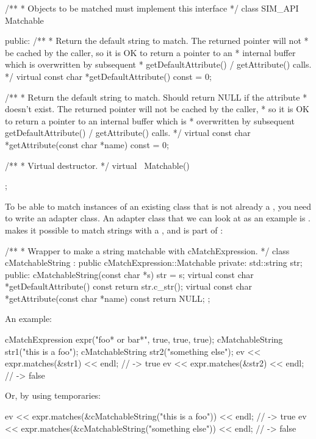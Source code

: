 \begin{cpp}
/**
 * Objects to be matched must implement this interface
 */
class SIM_API Matchable
{
  public:
    /**
     * Return the default string to match. The returned pointer will not
     * be cached by the caller, so it is OK to return a pointer to an
     * internal buffer which is overwritten by subsequent
     * getDefaultAttribute() / getAttribute() calls.
     */
    virtual const char *getDefaultAttribute() const = 0;

    /**
     * Return the default string to match. Should return NULL if the attribute
     * doesn't exist. The returned pointer will not be cached by the caller,
     * so it is OK to return a pointer to an internal buffer which is
     * overwritten by subsequent getDefaultAttribute() / getAttribute() calls.
     */
    virtual const char *getAttribute(const char *name) const = 0;

    /**
     * Virtual destructor.
     */
    virtual ~Matchable() {}
};
\end{cpp}

To be able to match instances of an existing class that is not already a
, you need to write an adapter class. An adapter class that
we can look at as an example is . 
makes it possible to match strings with a , and is part
of {\opp}:

\begin{cpp}
/**
 * Wrapper to make a string matchable with cMatchExpression.
 */
class cMatchableString : public cMatchExpression::Matchable
{
  private:
    std::string str;
  public:
    cMatchableString(const char *s) {str = s;}
    virtual const char *getDefaultAttribute() const {return str.c_str();}
    virtual const char *getAttribute(const char *name) const {return NULL;}
};
\end{cpp}

An example:

\begin{cpp}
cMatchExpression expr("foo* or bar*", true, true, true);
cMatchableString str1("this is a foo");
cMatchableString str2("something else");
ev << expr.matches(&str1) << endl; // -> true
ev << expr.matches(&str2) << endl; // -> false
\end{cpp}

Or, by using temporaries:

\begin{cpp}
ev << expr.matches(&cMatchableString("this is a foo")) << endl; // -> true
ev << expr.matches(&cMatchableString("something else")) << endl; // -> false
\end{cpp}



